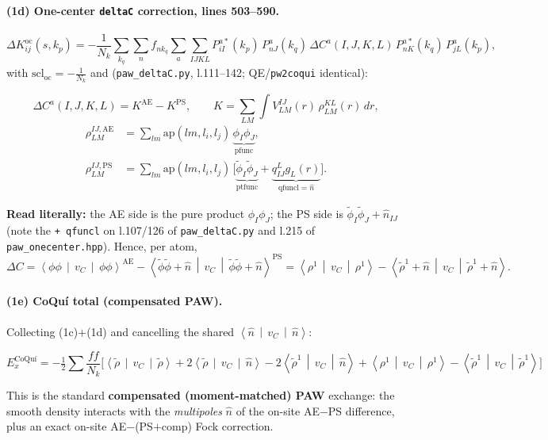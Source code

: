\documentclass[11pt]{article}
\newcommand{\rt}{\tilde{\rho}}
\newcommand{\vc}{v_C}
\newcommand{\avg}[3]{\left\langle #1 \,\middle|\, #2 \,\middle|\, #3 \right\rangle}
\newcommand{\code}[1]{\texttt{\small #1}}
\begin{document}
\paragraph{(1d) One-center \code{deltaC} correction, lines 503--590.}
\begin{equation}
\Delta K^{\text{oc}}_{ij}(s,k_p) = -\frac{1}{N_k}\sum_{k_q}\sum_n f_{n k_q}
   \sum_a\!\!\sum_{IJKL} P^{a*}_{iI}(k_p)\,P^{a}_{nJ}(k_q)\,
   \Delta C^{a}(I,J,K,L)\,P^{a*}_{nK}(k_q)\,P^{a}_{jL}(k_p),
\end{equation}
with $\mathrm{scl_{oc}}=-\tfrac{1}{N_k}$ and (\code{paw\_deltaC.py}, l.111--142;
QE/\code{pw2coqui} identical):
\begin{keybox}
\vspace{-2pt}
\begin{equation}
\Delta C^{a}(I,J,K,L) = K^{\text{AE}} - K^{\text{PS}},\qquad
K = \sum_{LM}\int V^{IJ}_{LM}(r)\,\rho^{KL}_{LM}(r)\,dr,
\end{equation}
\vspace{-14pt}
\begin{align}
\rho^{IJ,\text{AE}}_{LM} &= \sum_{lm}\mathrm{ap}(lm,l_i,l_j)\,\underbrace{\phi_I\phi_J}_{\text{pfunc}},\\
\rho^{IJ,\text{PS}}_{LM} &= \sum_{lm}\mathrm{ap}(lm,l_i,l_j)\,\big[\underbrace{\tilde\phi_I\tilde\phi_J}_{\text{ptfunc}} + \underbrace{q^{L}_{IJ}g_L(r)}_{\text{qfuncl}=\hat n}\big].
\end{align}
\vspace{-10pt}
\end{keybox}
\textbf{Read literally:} the AE side is the pure product $\phi_I\phi_J$; the PS side
is $\tilde\phi_I\tilde\phi_J + \hat n_{IJ}$ (note the \code{+ qfuncl} on l.107/126 of
\code{paw\_deltaC.py} and l.215 of \code{paw\_onecenter.hpp}). Hence, per atom,
\begin{equation}
\Delta C = \avg{\phi\phi}{\vc}{\phi\phi}^{\text{AE}}
   - \avg{\tilde\phi\tilde\phi + \hat n}{\vc}{\tilde\phi\tilde\phi + \hat n}^{\text{PS}}
   = \avg{\rho^1}{\vc}{\rho^1} - \avg{\rt^1+\hat n}{\vc}{\rt^1+\hat n} .
\end{equation}

\paragraph{(1e) CoQu\'i total (compensated PAW).}
Collecting (1c)$+$(1d) and cancelling the shared $\avg{\hat n}{\vc}{\hat n}$:
\begin{keybox}
\vspace{-2pt}
\begin{equation}
E^{\text{CoQu\'i}}_x = -\tfrac12\sum \frac{f f}{N_k}\Big[
   \avg{\rt}{\vc}{\rt}
 + 2\avg{\rt}{\vc}{\hat n}
 - 2\avg{\rt^1}{\vc}{\hat n}
 + \avg{\rho^1}{\vc}{\rho^1}
 - \avg{\rt^1}{\vc}{\rt^1}
\Big]
\end{equation}
\vspace{-10pt}
\end{keybox}
This is the standard \textbf{compensated (moment-matched) PAW} exchange: the smooth
density interacts with the \emph{multipoles} $\hat n$ of the on-site AE$-$PS
difference, plus an exact on-site AE$-$(PS$+$comp) Fock correction.
\end{document}
